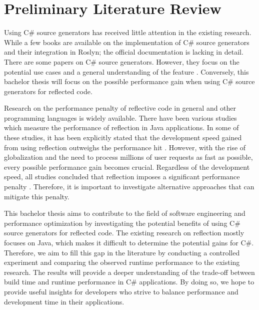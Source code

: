 \chapter{Preliminary Literature Review}

Using C\# source generators has received little attention in the existing research. While a few books \cite{Franz2022TrendsCompilerbau, Microsoft2022SourceGenerators, Vermeir2022.NETPlatform} are available on the implementation of C\# source generators and their integration in Roslyn; the official documentation \cite{Microsoft2022SourceGenerators} is lacking in detail. There are some papers on C\# source generators. However, they focus on the potential use cases and a general understanding of the feature \cite{Slimak2022SourceSLIMAK}. Conversely, this bachelor thesis will focus on the possible performance gain when using C\# source generators for reflected code.

Research on the performance penalty of reflective code in general and other programming languages is widely available. There have been various studies \cite{Forman2005EvaluatingPerformance, Halloway2001ReflectionInformIT, JavaReflection2013} which measure the performance of reflection in Java applications. In some of these studies, it has been explicitly stated that the development speed gained from using reflection outweighs the performance hit \cite{Halloway2001ReflectionInformIT}. However, with the rise of globalization and the need to process millions of user requests as fast as possible, every possible performance gain becomes crucial. Regardless of the development speed, all studies concluded that reflection imposes a significant performance penalty \cite{Forman2005EvaluatingPerformance, Halloway2001ReflectionInformIT, JavaReflection2013}. Therefore, it is important to investigate alternative approaches that can mitigate this penalty.

This bachelor thesis aims to contribute to the field of software engineering and performance optimization by investigating the potential benefits of using C\# source generators for reflected code. The existing research on reflection \cite{Forman2005EvaluatingPerformance, Halloway2001ReflectionInformIT, JavaReflection2013} mostly focuses on Java, which makes it difficult to determine the potential gains for C\#. Therefore, we aim to fill this gap in the literature by conducting a controlled experiment and comparing the observed runtime performance to the existing research. The results will provide a deeper understanding of the trade-off between build time and runtime performance in C\# applications. By doing so, we hope to provide useful insights for developers who strive to balance performance and development time in their applications.